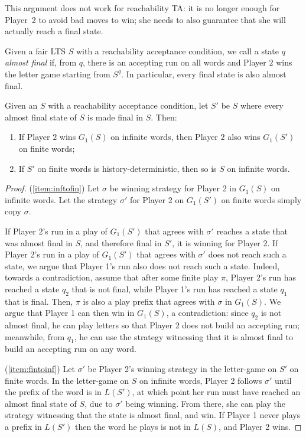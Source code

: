 \documentclass[10pt,a4paper]{amsart}
\theoremstyle{definition}
\numberwithin{equation}{section}
\newcommand{\strat}{\sigma}
\newcommand{\lts}{S}
\begin{document}
This argument does not work for reachability TA: it is no longer enough for Player~2 to avoid bad moves to win; she needs to also guarantee that she will actually reach a final state. 


Given a fair LTS $\lts$ with a reachability acceptance condition, we call a state $q$ \textit{almost final} if, from $q$, there is an accepting run on all words and Player $2$ wins the letter game starting from $\lts^q$. In particular, every final state is also almost final.


\begin{lemma}\label{lem:G1reach}
Given an $\lts$ with a reachability acceptance condition, let $\lts'$ be $\lts$ where every almost final state of $\lts$ is made final in $\lts$. Then:
\begin{enumerate}
\item \label{item:inftofin} If Player $2$ wins $G_1(\lts)$ on infinite words, then Player $2$ also wins $G_1(\lts')$ on finite words;
\item \label{item:fintoinf} If $\lts'$ on finite words is history-deterministic, then so is $\lts$ on infinite words.
\end{enumerate} 
\end{lemma}

\begin{proof}
(\ref{item:inftofin}) Let $\strat$ be winning strategy for Player 2 in $G_1(\lts)$ on infinite words. Let the strategy $\strat'$ for Player 2 on $G_1(\lts')$ on finite words simply copy $\strat$.

If Player 2's run in a play of $G_1(\lts')$ that agrees with $\strat'$ reaches a state that was almost final in $\lts$, and therefore final in $\lts'$, it is winning for Player 2. If Player 2's run in a play of $G_1(\lts')$ that agrees with $\strat'$ does not reach such a state, we argue that Player 1's run also does not reach such a state. Indeed, towards a contradiction, assume that after some finite play $\pi$, Player 2's run has reached a state $q_2$ that is not final, while Player 1's run has reached a state $q_1$ that is final. Then, $\pi$ is also a play prefix that agrees with $\strat$ in $G_1(\lts)$. We argue that Player 1 can then win in $G_1(\lts)$, a contradiction: since $q_2$ is not almost final, he can play letters so that Player 2 does not build an accepting run; meanwhile, from $q_1$, he can use the strategy witnessing that it is almost final to build an accepting run on any word.

(\ref{item:fintoinf}) Let $\strat'$ be Player 2's winning strategy in the letter-game on $\lts'$ on finite words. In the letter-game on $\lts$ on infinite words, Player 2 follows $\strat'$ until the prefix of the word is in $L(\lts')$, at which point her run must have reached an almost final state of $\lts$, due to $\strat'$ being winning. From there, she can play the strategy witnessing that the state is almost final, and win.
If Player 1 never plays a prefix in $L(\lts')$ then the word he plays is not in $L(\lts)$, and Player 2 wins.
\end{proof}
\end{document}
